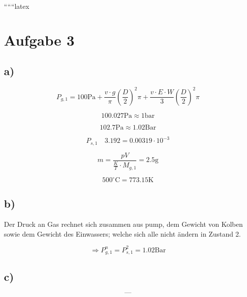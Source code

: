 
``````latex


\section*{Aufgabe 3}

\subsection*{a)}
\begin{equation*}
P_{g,1} = 100 \text{Pa} + \frac{v \cdot g}{\pi} \left( \frac{D}{2} \right)^2 \pi + \frac{v \cdot E \cdot W}{3} \left( \frac{D}{2} \right)^2 \pi
\end{equation*}

\begin{equation*}
100.027 \text{Pa} \approx 1 \text{bar}
\end{equation*}

\begin{equation*}
102.7 \text{Pa} \approx 1.02 \text{Bar}
\end{equation*}

\begin{equation*}
P_{s,1} \quad 3.192 = 0.00319 \cdot 10^{-3}
\end{equation*}

\begin{equation*}
m = \frac{pV}{\frac{K}{T} \cdot M_{g,1}} = 2.5 \text{g}
\end{equation*}

\begin{equation*}
500^\circ \text{C} = 773.15 \text{K}
\end{equation*}

\subsection*{b)}
Der Druck an Gas rechnet sich zusammen aus pump, dem Gewicht von Kolben sowie dem Gewicht des Einwassers; welche sich alle nicht ändern in Zustand 2.

\begin{equation*}
\Rightarrow P_{g,1}^n = P_{s,1}^2 = 1.02 \text{Bar}
\end{equation*}

\subsection*{c)}
\begin{equation*}
\text{---}
\end{equation*}


